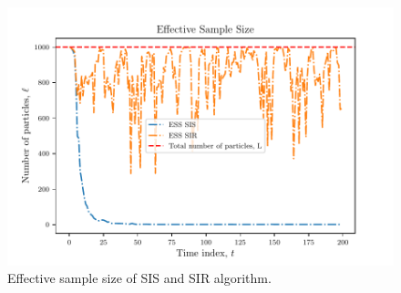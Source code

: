 \documentclass{article}
\begin{document}
\begin{figure}
    \centering
    \includegraphics[width=.7\textwidth]{Figures/ess.pdf}
    \caption{Effective sample size of SIS and SIR algorithm.}
    \label{fig:ess}
\end{figure}
\end{document}
